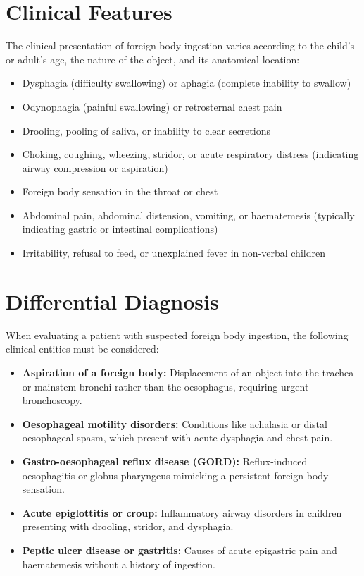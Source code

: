 \section*{Clinical Features}
The clinical presentation of foreign body ingestion varies according to the child's or adult's age, the nature of the object, and its anatomical location:
\begin{itemize}
    \item Dysphagia (difficulty swallowing) or aphagia (complete inability to swallow)
    \item Odynophagia (painful swallowing) or retrosternal chest pain
    \item Drooling, pooling of saliva, or inability to clear secretions
    \item Choking, coughing, wheezing, stridor, or acute respiratory distress (indicating airway compression or aspiration)
    \item Foreign body sensation in the throat or chest
    \item Abdominal pain, abdominal distension, vomiting, or haematemesis (typically indicating gastric or intestinal complications)
    \item Irritability, refusal to feed, or unexplained fever in non-verbal children
\end{itemize}

\section*{Differential Diagnosis}
When evaluating a patient with suspected foreign body ingestion, the following clinical entities must be considered:
\begin{itemize}
    \item \textbf{Aspiration of a foreign body:} Displacement of an object into the trachea or mainstem bronchi rather than the oesophagus, requiring urgent bronchoscopy.
    \item \textbf{Oesophageal motility disorders:} Conditions like achalasia or distal oesophageal spasm, which present with acute dysphagia and chest pain.
    \item \textbf{Gastro-oesophageal reflux disease (GORD):} Reflux-induced oesophagitis or globus pharyngeus mimicking a persistent foreign body sensation.
    \item \textbf{Acute epiglottitis or croup:} Inflammatory airway disorders in children presenting with drooling, stridor, and dysphagia.
    \item \textbf{Peptic ulcer disease or gastritis:} Causes of acute epigastric pain and haematemesis without a history of ingestion.
\end{itemize}

